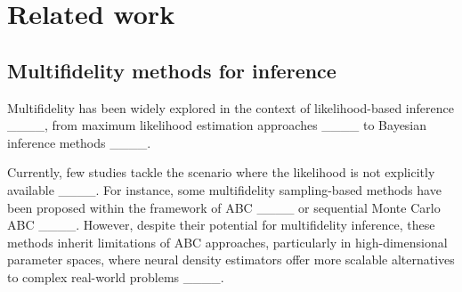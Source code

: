 \section{Related work}




\subsection{Multifidelity methods for inference} %



Multifidelity has been widely explored in the context of likelihood-based inference ____, from maximum likelihood estimation approaches ____ to Bayesian inference methods ____.

Currently, few studies tackle the scenario where the likelihood is not explicitly available ____. For instance, some multifidelity sampling-based methods have been proposed within the framework of ABC ____ or sequential Monte Carlo ABC ____. However, despite their potential for multifidelity inference, these methods inherit limitations of ABC approaches, particularly in high-dimensional parameter spaces, where neural density estimators offer more scalable alternatives to complex real-world problems ____.

